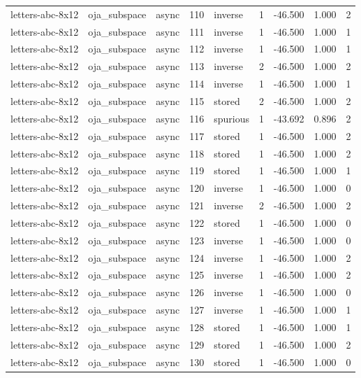 \begin{tabular}{lllrlrrrr}
letters-abc-8x12 & oja\_subspace & async & 110 & inverse & 1 & -46.500 & 1.000 & 2 \\
letters-abc-8x12 & oja\_subspace & async & 111 & inverse & 1 & -46.500 & 1.000 & 1 \\
letters-abc-8x12 & oja\_subspace & async & 112 & inverse & 1 & -46.500 & 1.000 & 1 \\
letters-abc-8x12 & oja\_subspace & async & 113 & inverse & 2 & -46.500 & 1.000 & 2 \\
letters-abc-8x12 & oja\_subspace & async & 114 & inverse & 1 & -46.500 & 1.000 & 1 \\
letters-abc-8x12 & oja\_subspace & async & 115 & stored & 2 & -46.500 & 1.000 & 2 \\
letters-abc-8x12 & oja\_subspace & async & 116 & spurious & 1 & -43.692 & 0.896 & 2 \\
letters-abc-8x12 & oja\_subspace & async & 117 & stored & 1 & -46.500 & 1.000 & 2 \\
letters-abc-8x12 & oja\_subspace & async & 118 & stored & 1 & -46.500 & 1.000 & 2 \\
letters-abc-8x12 & oja\_subspace & async & 119 & stored & 1 & -46.500 & 1.000 & 1 \\
letters-abc-8x12 & oja\_subspace & async & 120 & inverse & 1 & -46.500 & 1.000 & 0 \\
letters-abc-8x12 & oja\_subspace & async & 121 & inverse & 2 & -46.500 & 1.000 & 2 \\
letters-abc-8x12 & oja\_subspace & async & 122 & stored & 1 & -46.500 & 1.000 & 0 \\
letters-abc-8x12 & oja\_subspace & async & 123 & inverse & 1 & -46.500 & 1.000 & 0 \\
letters-abc-8x12 & oja\_subspace & async & 124 & inverse & 1 & -46.500 & 1.000 & 2 \\
letters-abc-8x12 & oja\_subspace & async & 125 & inverse & 1 & -46.500 & 1.000 & 2 \\
letters-abc-8x12 & oja\_subspace & async & 126 & inverse & 1 & -46.500 & 1.000 & 0 \\
letters-abc-8x12 & oja\_subspace & async & 127 & inverse & 1 & -46.500 & 1.000 & 1 \\
letters-abc-8x12 & oja\_subspace & async & 128 & stored & 1 & -46.500 & 1.000 & 1 \\
letters-abc-8x12 & oja\_subspace & async & 129 & stored & 1 & -46.500 & 1.000 & 2 \\
letters-abc-8x12 & oja\_subspace & async & 130 & stored & 1 & -46.500 & 1.000 & 0 \\

\end{tabular}
